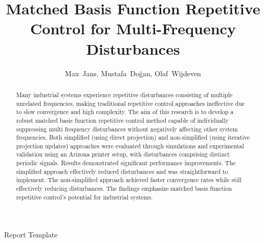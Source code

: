 \documentclass[journal]{IEEEtran}
\begin{document}
%
\title{Matched Basis Function Repetitive Control for Multi-Frequency Disturbances}
%
%


\author{Max~Jans,
        Mustafa~Doğan,
        Olaf~Wijdeven}
% 



%
{Report Template}

\maketitle

\begin{abstract}
Many industrial systems experience repetitive disturbances consisting of multiple unrelated frequencies, making traditional repetitive control approaches ineffective due to slow convergence and high complexity. The aim of this research is to develop a robust matched basis function repetitive control method capable of individually suppressing multi frequency disturbances without negatively affecting other system frequencies. Both simplified (using direct projection) and non-simplified (using iterative projection updates) approaches were evaluated through simulations and experimental validation using an Arizona printer setup, with disturbances comprising distinct periodic signals. Results demonstrated significant performance improvements. The simplified approach effectively reduced disturbances and was straightforward to implement. The non-simplified approach achieved faster convergence rates while still effectively reducing disturbances. The findings emphasize matched basis function repetitive control's potential for industrial systems.
\end{abstract}
\end{document}
